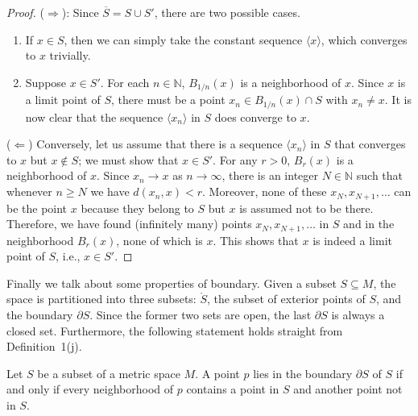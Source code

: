 \documentclass[11pt]{article}
\begin{document}
\begin{proof}
  ($\Rightarrow$): Since $\overline{S} = S \cup S'$, there are two possible cases.
  \begin{enumerate}
    \item If $x \in S$, then we can simply take the constant sequence $\langle x \rangle$, which converges to $x$ trivially.

    \item Suppose $x \in S'$.  For each $n \in \mathbb{N}$, $B_{1/n}(x)$ is a neighborhood of $x$.  Since $x$ is a limit point of $S$, there must be a point $x_n \in B_{1/n}(x) \cap S$ with $x_n \ne x$.  It is now clear that the sequence $\langle x_n \rangle$ in $S$ does converge to $x$.
  \end{enumerate}

  ($\Leftarrow$) Conversely, let us assume that there is a sequence $\langle x_n \rangle$ in $S$ that converges to $x$ but $x \notin S$; we must show that $x \in S'$.  For any $r > 0$, $B_r(x)$ is a neighborhood of $x$.  Since $x_n \to x$ as $n \to \infty$, there is an integer $N \in \mathbb{N}$ such that whenever $n \geqslant N$ we have $d(x_n,x) < r$.  Moreover, none of these $x_N, x_{N+1}, \dots$ can be the point $x$ because they belong to $S$ but $x$ is assumed not to be there.  Therefore, we have found (infinitely many) points $x_N, x_{N+1}, \dots$ in $S$ and in the neighborhood $B_r(x)$, none of which is $x$.  This shows that $x$ is indeed a limit point of $S$, i.e., $x \in S'$.
\end{proof}

Finally we talk about some properties of boundary.
Given a subset $S \subseteq M$, the space is partitioned into three subsets: $\mathring{S}$, the subset of exterior points of $S$, and the boundary $\partial S$.  Since the former two sets are open, the last $\partial S$ is always a closed set.
Furthermore, the following statement holds straight from Definition~1(j).

\begin{prop}
  Let $S$ be a subset of a metric space $M$.
  A point $p$ lies in the boundary $\partial S$ of $S$ if and only if every neighborhood of $p$ contains a point in $S$ and another point not in $S$.
\end{prop}
\end{document}
